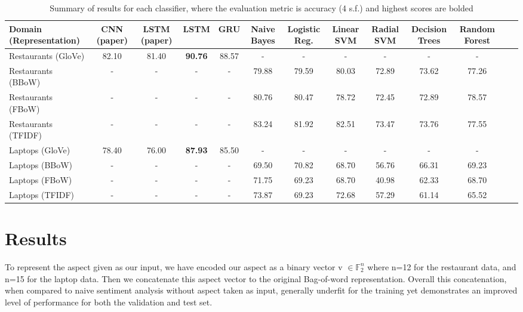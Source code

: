 \documentclass[comsoc,conference]{IEEEtran}
\begin{document}
\begin{table}
\label{my-label}
\begin{tabularx}{\textwidth}{@{}l*{11}{C}c@{}}
\toprule
Domain (Representation) & CNN (paper) & LSTM (paper) & LSTM & GRU & Naive Bayes & Logistic Reg. & Linear SVM & Radial SVM & Decision Trees & Random Forest \\ 
\midrule
Restaurants (GloVe)    & 82.10 & 81.40 & \textbf{90.76} & 88.57 & -     & -     & -     & -     & -     & -     \\
Restaurants (BBoW)     & -     & -     & -              & -     & 79.88 & 79.59 & 80.03 & 72.89 & 73.62 & 77.26 \\
Restaurants (FBoW)     & -     & -     & -              & -     & 80.76 & 80.47 & 78.72 & 72.45 & 72.89 & 78.57 \\
Restaurants (TFIDF)    & -     & -     & -              & -     & 83.24 & 81.92 & 82.51 & 73.47 & 73.76 & 77.55 \\
Laptops (GloVe)        & 78.40 & 76.00 & \textbf{87.93} & 85.50 & -     & -     & -     & -     & -     & -     \\
Laptops (BBoW)         & -     & -     & -              & -     & 69.50 & 70.82 & 68.70 & 56.76 & 66.31 & 69.23 \\
Laptops (FBoW)         & -     & -     & -              & -     & 71.75 & 69.23 & 68.70 & 40.98 & 62.33 & 68.70 \\
Laptops (TFIDF)        & -     & -     & -              & -     & 73.87 & 69.23 & 72.68 & 57.29 & 61.14 & 65.52 \\
\bottomrule
\end{tabularx}
\caption{Summary of results for each classifier, where the evaluation metric is accuracy (4 s.f.) and highest scores are bolded}
\end{table}

\section{Results}
To represent the aspect given as our input, we have encoded our aspect as a binary vector v $\in \mathbb{F}_2 ^n$ where n=12 for the restaurant data, and n=15 for the laptop data. Then we concatenate this aspect vector to the original Bag-of-word representation. Overall this concatenation, when compared to naive sentiment analysis without aspect taken as input, generally underfit for the training yet demonstrates an improved level of performance for both the validation and test set.
\end{document}
